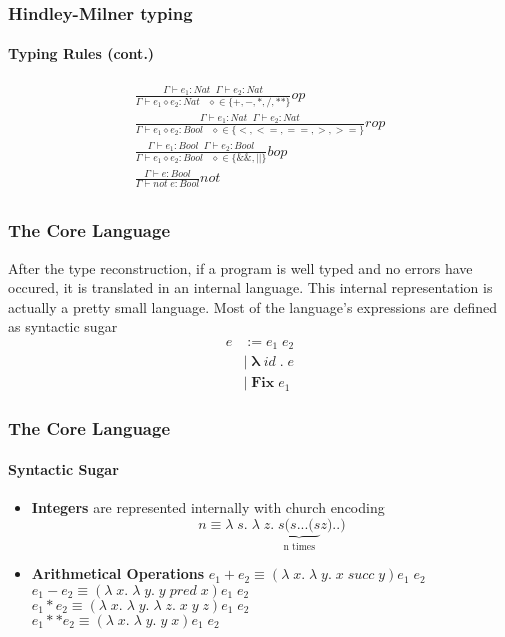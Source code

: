 \documentclass[xcolor=table]{beamer}
\newcommand{\bs}[1]{\boldsymbol{#1}}
\begin{document}
\begin{frame}
\frametitle{Hindley-Milner typing}
\framesubtitle{Typing Rules (cont.)}
\begin{small}
 \begin{gather*}
 \frac{\Gamma \vdash e_1 : Nat \;\; \Gamma \vdash e_2: Nat }{\Gamma \vdash e_1 \diamond e_2: Nat \;\;\; \diamond \in \lbrace +, -, *, /, **\rbrace}op \\[0.3cm]
 \frac{\Gamma \vdash e_1 : Nat \;\; \Gamma \vdash e_2: Nat }{\Gamma \vdash e_1 \diamond e_2: Bool \;\;\; \diamond \in \lbrace <, <=,==,>,>=\rbrace}rop \\[0.3cm]
 \frac{\Gamma \vdash e_1 : Bool \;\; \Gamma \vdash e_2: Bool }{\Gamma \vdash e_1 \diamond e_2: Bool \;\;\; \diamond \in \lbrace \&\&, || \rbrace }bop \\[0.3cm]
 \frac{\Gamma \vdash e : Bool }{\Gamma \vdash not \; e: Bool}not \\
\end{gather*}
\end{small}
\end{frame} 

%

\begin{frame}
\frametitle{The Core Language}
\begin{block}{
After the type reconstruction, if a program is well typed and no errors have occured, it is translated in an internal language. This internal representation is actually a pretty small language. Most of the language's expressions are defined as syntactic sugar}
\begin{align*}
e & := e_1 \; e_2 	 \\
   & | \; \bs{\lambda} \; id \; \bs{ .} \; e \\
   & | \; \bs{Fix} \; e_1                                                                 
\end{align*}
\end{block}
\end{frame}

%

\begin{frame}
\frametitle{The Core Language}
\framesubtitle{Syntactic Sugar}
\begin{itemize}
\item \textbf{Integers} are represented internally with church encoding\\
$$n \equiv \lambda \;s.\; \lambda \; z. \; \underbrace{s(s ... (s }_\text{n times} z)..)$$
\item \textbf{Arithmetical Operations} $e_1 + e_2 \equiv (\lambda \; x. \; \lambda \; y.\; x \; succ \; y) e_1 \; e_2$\\
$e_1 - e_2 \equiv (\lambda \; x. \; \lambda \; y.\; y \; pred \; x) e_1 \; e_2$ \\
$e_1 * e_2 \equiv (\lambda \; x. \; \lambda \; y.\; \lambda \; z. \;  x \; y \; z) e_1 \; e_2$ \\
$e_1 ** e_2 \equiv (\lambda \; x. \; \lambda \; y.\;  y \; x ) e_1 \; e_2$ \\
\end{itemize}
\end{frame}
\end{document}
